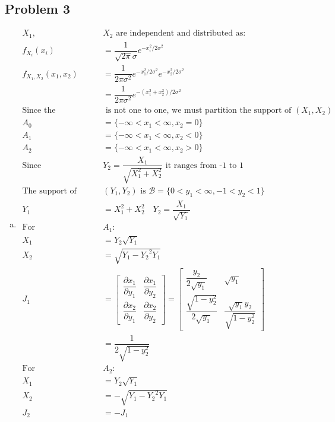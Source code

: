 \documentclass{article}
\begin{document}
\begin{flushleft}
\section*{Problem 3}
\begin{enumerate}[(a)]
\item 
\begin{align*}
X_1,& X_2 \text{ are independent and distributed as:}\\
f_{X_i}(x_i)&=\dfrac{1}{\sqrt{2\pi}\sigma}e^{-x_i^2/2\sigma^2}\\
f_{X_1,X_2}(x_1,x_2)&=\dfrac{1}{2\pi\sigma^2}e^{-x_1^2/2\sigma^2}e^{-x_2^2/2\sigma^2}\\
&=\dfrac{1}{2\pi\sigma^2}e^{-(x_1^2+x_2^2)/2\sigma^2}\\
\text{Since the transformation}&\text{ is not one to one, we must partition the support of } (X_1,X_2)\\
A_0&=\{-\infty<x_1<\infty,x_2=0\}\\
A_1&=\{-\infty<x_1<\infty,x_2<0\}\\
A_2&=\{-\infty<x_1<\infty,x_2>0\}\\
\text{Since } & Y_2=\dfrac{X_1}{\sqrt{X_1^2+X_2^2}} \text{ it ranges from -1 to 1} \\
\text{The support of } & (Y_1, Y_2) \text{ is } \mathcal{B}=\{0<y_1<\infty, -1<y_2<1 \}\\
Y_1&=X_1^2+X_2^2 \quad Y_2=\dfrac{X_1}{\sqrt{Y_1}}\\
\text{For }& A_1:\\
X_1&=Y_2\sqrt{Y_1}\\
X_2&=\sqrt{Y_1-{Y_2}^2Y_1}\\
J_1&=\begin{bmatrix}
\dfrac{\partial x_1}{\partial y_1} & 
\dfrac{\partial x_1}{\partial y_2}\\ 
\dfrac{\partial x_2}{\partial y_1} &
\dfrac{\partial x_2}{\partial y_2} 
\end{bmatrix}
=\begin{bmatrix}
\dfrac{y_2}{2\sqrt{y_1}} & 
\sqrt{y_1}\\ 
\dfrac{\sqrt{1-y_2^2}}{2\sqrt{y_1}}&
\dfrac{\sqrt{y_1}y_2}{\sqrt{1-y_2^2}} 
\end{bmatrix}\\
&=\dfrac{1}{2\sqrt{1-y_2^2}}\\
\text{For } &A_2:\\
X_1&=Y_2\sqrt{Y_1}\\
X_2&=-\sqrt{Y_1-{Y_2}^2Y_1}\\
J_2&=-J_1\\

\end{align*}
\end{enumerate}
\end{flushleft}
\end{document}
